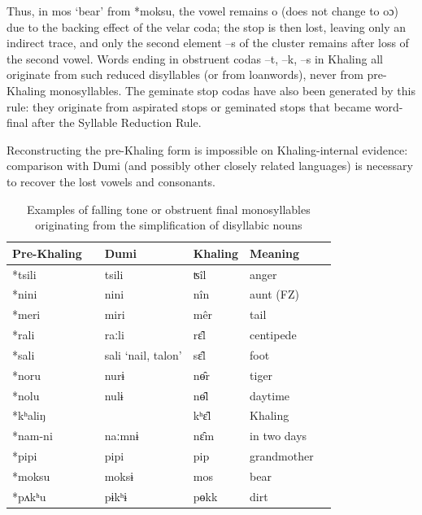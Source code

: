 \documentclass[oldfontcommands,oneside,a4paper,11pt]{article}
\newcommand{\ipa}[1]{{\phon \mbox{#1}}} %
\begin{document}
Thus, in  \ipa{mos}	`bear' from \ipa{*moksu}, the vowel remains \ipa{o} (does not change to \ipa{oɔ}) due to the backing effect of the velar coda; the stop is then lost, leaving only an indirect trace, and only the second element \ipa{--s} of the cluster remains after loss of the second vowel. Words ending in obstruent codas \ipa{--t}, \ipa{--k}, \ipa{--s}   in Khaling all originate from such reduced disyllables (or from loanwords), never from pre-Khaling monosyllables. The geminate stop codas have also been generated by this rule: they originate from aspirated stops or geminated stops that  became word-final after the Syllable Reduction Rule.

Reconstructing the pre-Khaling form is impossible on Khaling-internal evidence: comparison with Dumi (and possibly other closely related languages) is necessary to recover the lost vowels and consonants.

\begin{table}[h]
\caption{Examples of falling tone or obstruent final  monosyllables originating from the simplification of   disyllabic nouns } \centering \label{tab:falling.reduction}
\begin{tabular}{llllll}
\toprule
Pre-Khaling	 &	&Dumi	&Khaling	&Meaning\\
\midrule
\ipa{*tsili}			&&	\ipa{tsili}	&	\ipa{ʦîl}	&	anger\\
\ipa{*nini	}		&&	\ipa{nini}	&	\ipa{nîn}		&aunt (FZ)\\
\ipa{*meri}		&&		\ipa{miri}	&	\ipa{mêr}	&	tail\\
\ipa{*rali	}		&&	\ipa{raːli}	&	\ipa{rɛ̂l}		&centipede \\
\ipa{*sali	}		&&	\ipa{sali} `nail, talon'	&	\ipa{sɛ̂l}		&foot \\
\midrule
\ipa{*noru	}		&&	\ipa{nurɨ}	&	\ipa{nɵ̂r}		& tiger \\
\ipa{*nolu	}		&&	\ipa{nulɨ}	&	\ipa{nɵ̂l}		& daytime \\
\midrule
\ipa{*kʰaliŋ}				&&&	\ipa{kʰɛ‍̂l}	&	Khaling\\
\ipa{*nam-ni}	&&		\ipa{naːmnɨ	}&	\ipa{nɛ̂m}	&	in two days\\
\midrule
\ipa{*pipi} 	&   & \ipa{pipi}	&	\ipa{pip}		& grandmother \\
\ipa{*moksu} 	&   & \ipa{moksɨ}	&	\ipa{mos}		&bear \\
\ipa{*pʌkʰu} 	&   & \ipa{pɨkʰɨ}	&	\ipa{pɵkk}		& dirt \\
\bottomrule
\end{tabular}
\end{table}
\end{document}
